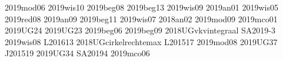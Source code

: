 2019mod06
2019wis10
2019beg08
2019beg13
2019wis09
2019an01
2019wis05
2019red08
2019an09
2019beg11
2019wis07
2018an02
2019mod09
2019mco01
2019UG24
2019UG23
2019beg06
2019beg09
2018UGvkvintegraal
SA2019-3
2019wis08
L201613
2018UGcirkelrechtemax
L201517
2019mod08
2019UG37
J201519
2019UG34
SA20194
2019mco06
